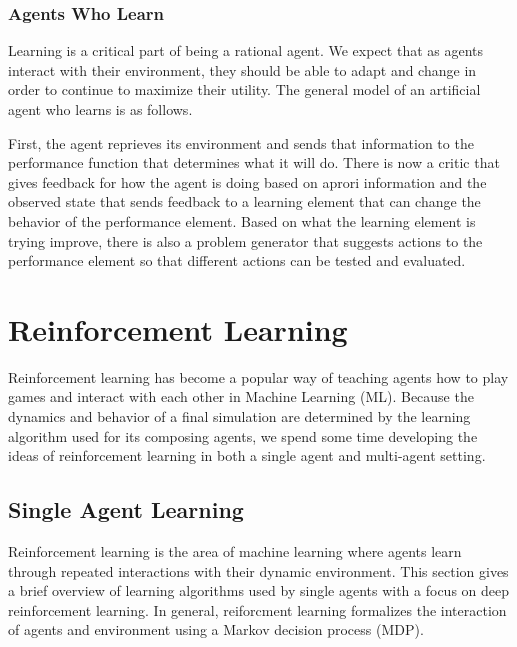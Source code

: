 \documentclass[12pt,twoside]{reedthesis}
\begin{document}
\subsection{Agents Who Learn}

Learning is a critical part of being a rational agent. We expect that as agents interact with their environment, they should be able to adapt and change in order to continue to maximize their utility. The general model of an artificial agent who learns is as follows. 



First, the agent reprieves its environment and sends that information to the performance function that determines what it will do. There is now a critic that gives feedback for how the agent is doing based on aprori information and the observed state that sends feedback to a learning element that can change the behavior of the performance element. Based on what the learning element is trying improve, there is also a problem generator that suggests actions to the performance element so that different actions can be tested and evaluated. \cite{Russel2010}
\chapter{Reinforcement Learning}	

Reinforcement learning has become a popular way of teaching agents how to play games and interact with each other in Machine Learning (ML). Because the dynamics and behavior of a final simulation are determined by the learning algorithm used for its composing agents, we spend some time developing the ideas of reinforcement learning in both a single agent and multi-agent setting. 
\section{Single Agent Learning}
	Reinforcement learning is the area of machine learning where agents learn through repeated interactions with their dynamic environment. This section gives a brief overview of learning algorithms used by single agents with a focus on deep reinforcement learning. In general, reiforcment learning formalizes the interaction of agents and environment using a Markov decision process (MDP).\\
	
\end{document}
